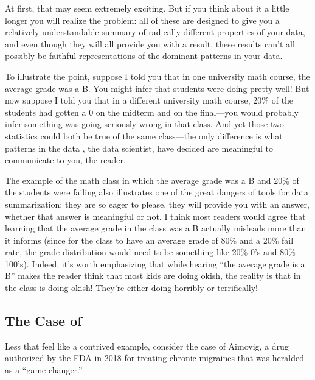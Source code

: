 \documentclass[letterpaper,10pt,english]{jupyterBook}
\begin{document}
\sphinxAtStartPar
At first, that may seem extremely exciting. But if you think about it a little longer you will realize the problem: all of these are designed to give you a relatively understandable summary of radically different properties of your data, and even though they will all provide you with a result, these results can’t all possibly be faithful representations of the dominant patterns in your data.

\sphinxAtStartPar
To illustrate the point, suppose I told you that in one university math course, the average grade was a B\sphinxhyphen{}. You might infer that students were doing pretty well! But now suppose I told you that in a different university math course, 20\% of the students had gotten a 0 on the midterm and on the final—you would probably infer something was going seriously wrong in that class. And yet those two statistics could both be true of the same class—the only difference is what patterns in the data , the data scientist, have decided are meaningful to communicate to you, the reader.

\sphinxAtStartPar
The example of the math class in which the average grade was a B\sphinxhyphen{} and 20\% of the students were failing also illustrates one of the great dangers of tools for data summarization: they are so eager to please, they will  provide you with an answer, whether that answer is meaningful or not. I think most readers would agree that learning that the average grade in the class was a B\sphinxhyphen{} actually misleads more than it informs (since for the class to have an average grade of 80\% and a 20\% fail rate, the grade distribution would need to be something like 20\% 0’s and 80\% 100’s). Indeed, it’s worth emphasizing that while hearing “the average grade is a B\sphinxhyphen{}” makes the reader think that most kids are doing ok\sphinxhyphen{}ish, the reality is that  in the class is doing ok\sphinxhyphen{}ish! They’re either doing horribly or terrifically!


\subsection{The Case of }
\label{\detokenize{30_questions/18_exploratory_internal_faithful:the-case-of-aimovig}}
\sphinxAtStartPar
Less that feel like a contrived example, consider the case of Aimovig, a drug authorized by the FDA in 2018 for treating chronic migraines that was heralded as a “game changer.”
\end{document}

